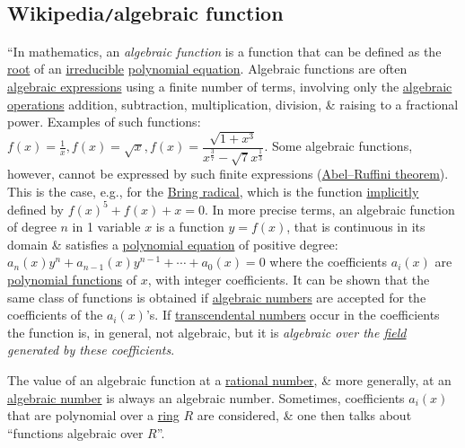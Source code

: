 \documentclass{article}
\begin{document}

\subsection{Wikipedia{\tt/}algebraic function}
``In mathematics, an {\it algebraic function} is a function that can be defined as the \href{https://en.wikipedia.org/wiki/Zero_of_a_function}{root} of an \href{https://en.wikipedia.org/wiki/Irreducible_polynomial}{irreducible} \href{https://en.wikipedia.org/wiki/Polynomial_equation}{polynomial equation}. Algebraic functions are often \href{https://en.wikipedia.org/wiki/Algebraic_expression}{algebraic expressions} using a finite number of terms, involving only the \href{https://en.wikipedia.org/wiki/Algebraic_operations}{algebraic operations} addition, subtraction, multiplication, division, \& raising to a fractional power. Examples of such functions: $f(x) = \frac{1}{x},f(x) = \sqrt{x},f(x) = \dfrac{\sqrt{1 + x^3}}{x^{\frac{3}{7}} - \sqrt{7}x^{\frac{1}{3}}}$. Some algebraic functions, however, cannot be expressed by such finite expressions (\href{https://en.wikipedia.org/wiki/Abel%E2%80%93Ruffini_theorem}{Abel--Ruffini theorem}). This is the case, e.g., for the \href{https://en.wikipedia.org/wiki/Bring_radical}{Bring radical}, which is the function \href{https://en.wikipedia.org/wiki/Implicit_function}{implicitly} defined by $f(x)^5 + f(x) + x = 0$. In more precise terms, an algebraic function of degree $n$ in 1 variable $x$ is a function $y = f(x)$, that is continuous in its domain \& satisfies a \href{https://en.wikipedia.org/wiki/Polynomial_equation}{polynomial equation} of positive degree: $a_n(x)y^n + a_{n-1}(x)y^{n-1} + \cdots + a_0(x) = 0$ where the coefficients $a_i(x)$ are \href{https://en.wikipedia.org/wiki/Polynomial_function}{polynomial functions} of $x$, with integer coefficients. It can be shown that the same class of functions is obtained if \href{https://en.wikipedia.org/wiki/Algebraic_numbers}{algebraic numbers} are accepted for the coefficients of the $a_i(x)$'s. If \href{https://en.wikipedia.org/wiki/Transcendental_number}{transcendental numbers} occur in the coefficients the function is, in general, not algebraic, but it is {\it algebraic over the \href{https://en.wikipedia.org/wiki/Field_(mathematics)}{field} generated by these coefficients}.

The value of an algebraic function at a \href{https://en.wikipedia.org/wiki/Rational_number}{rational number}, \& more generally, at an \href{https://en.wikipedia.org/wiki/Algebraic_number}{algebraic number} is always an algebraic number. Sometimes, coefficients $a_i(x)$ that are polynomial over a \href{https://en.wikipedia.org/wiki/Ring_(mathematics)}{ring} $R$ are considered, \& one then talks about ``functions algebraic over $R$''.
\end{document}
